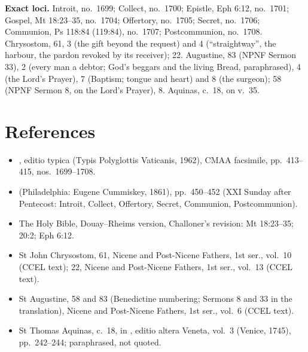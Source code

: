 {\textbf{Exact loci.} Introit, no.~1699; Collect, no.~1700; Epistle, Eph 6:12,
no.~1701; Gospel, Mt 18:23--35, no.~1704; Offertory, no.~1705; Secret,
no.~1706; Communion, Ps 118:84 (119:84), no.~1707; Postcommunion, no.~1708.
Chrysostom,  61, 3 (the gift beyond the request) and
4 (``straightway'', the harbour, the pardon revoked by its receiver);
 22. Augustine,  83 (NPNF Sermon 33),
2 (every man a debtor; God's beggars and the living Bread, paraphrased), 4 (the
Lord's Prayer), 7 (Baptism; tongue and heart) and 8 (the surgeon);
 58 (NPNF Sermon 8, on the Lord's Prayer), 8. Aquinas,
 c.~18, on v.~35.

\par}

\section*{References}

{\footnotesize
\begin{itemize}\setlength{\itemsep}{0.15em}\setlength{\parskip}{0pt}
\item {}, editio typica (Typis Polyglottis Vaticanis, 1962), CMAA facsimile, pp.~413--415, nos.~1699--1708.
\item {} (Philadelphia: Eugene Cummiskey, 1861), pp.~450--452 (XXI Sunday after Pentecost: Introit, Collect, Offertory, Secret, Communion, Postcommunion).
\item The Holy Bible, Douay--Rheims version, Challoner's revision: Mt 18:23--35; 20:2; Eph 6:12.
\item St John Chrysostom,  61, Nicene and Post-Nicene Fathers, 1st ser., vol.~10 (CCEL text);  22, Nicene and Post-Nicene Fathers, 1st ser., vol.~13 (CCEL text).
\item St Augustine,  58 and 83 (Benedictine numbering; Sermons 8 and 33 in the translation), Nicene and Post-Nicene Fathers, 1st ser., vol.~6 (CCEL text).
\item St Thomas Aquinas,  c.~18, in , editio altera Veneta, vol.~3 (Venice, 1745), pp.~242--244; paraphrased, not quoted.
\end{itemize}
\par}
